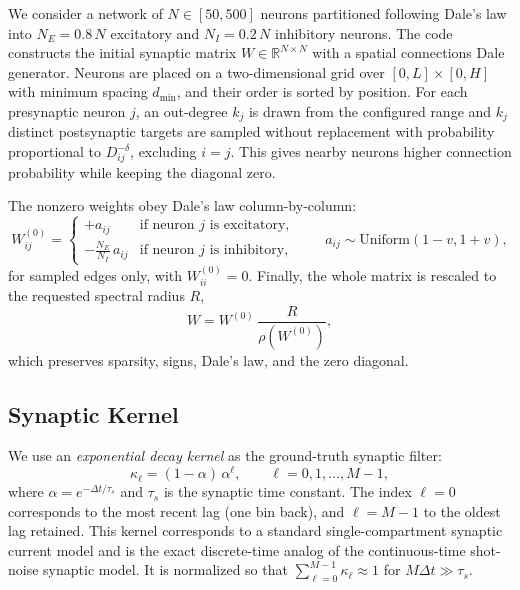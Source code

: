\documentclass[11pt]{article}
\begin{document}
We consider a network of $N\in[50, 500]$ neurons partitioned following Dale's law
into $N_E = 0.8\,N$ excitatory and $N_I = 0.2\,N$ inhibitory neurons.
The code constructs the initial synaptic matrix $W\in\mathbb{R}^{N\times N}$
with a spatial connections Dale generator. Neurons are
placed on a two-dimensional grid over $[0,L]\times[0,H]$ with minimum spacing
$d_{\min}$, and their order is sorted by position. For each presynaptic neuron
$j$, an out-degree $k_j$ is drawn from the configured range and $k_j$ distinct
postsynaptic targets are sampled without replacement with probability
proportional to $D_{ij}^{-\delta}$, excluding $i=j$. This gives nearby neurons
higher connection probability while keeping the diagonal zero.

The nonzero weights obey Dale's law column-by-column:
\begin{equation}
W^{(0)}_{ij} =
\begin{cases}
+a_{ij} & \text{if neuron } j \text{ is excitatory},\\
-\frac{N_E}{N_I}\,a_{ij} & \text{if neuron } j \text{ is inhibitory},
\end{cases}
\qquad
a_{ij}\sim\mathrm{Uniform}(1-v,1+v),
\label{eq:weight_draw}
\end{equation}
for sampled edges only, with $W^{(0)}_{ii}=0$. Finally, the whole matrix is
rescaled to the requested spectral radius $R$,
\begin{equation}
W = W^{(0)}\,\frac{R}{\rho(W^{(0)})},
\label{eq:weight_matrix}
\end{equation}
which preserves sparsity, signs, Dale's law, and the zero diagonal.


\subsection{Synaptic Kernel}
\label{sec:gen_kernel}

We use an \emph{exponential decay kernel} as the ground-truth synaptic filter:
\begin{equation}
\kappa_\ell = (1-\alpha)\,\alpha^{\ell}, \qquad \ell = 0,1,\dots,M-1,
\label{eq:exp_kernel}
\end{equation}
where $\alpha = e^{-\Delta t/\tau_s}$ and $\tau_s$ is the synaptic time constant.
The index $\ell=0$ corresponds to the most recent lag (one bin back), and
$\ell=M-1$ to the oldest lag retained.
This kernel corresponds to a standard single-compartment synaptic current model
and is the exact discrete-time analog of the continuous-time shot-noise synaptic
model. It is normalized so that $\sum_{\ell=0}^{M-1}\kappa_\ell \approx 1$ for
$M\Delta t \gg \tau_s$.
\end{document}

